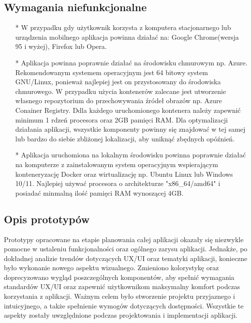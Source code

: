 \subsection{Wymagania niefunkcjonalne}
\begin{itemize}
    \item[*] W przypadku gdy użytkownik korzysta z komputera stacjonarnego lub urządzenia mobilnego aplikacja powinna działać na: Google Chrome(wersja 95 i wyżej), Firefox lub Opera. 
    \item[*] Aplikacja powinna poprawnie działać na środowisku chmurowym np. Azure. Rekomendowanym systemem operacyjnym jest 64 bitowy system GNU/Linux, ponieważ najlepiej jest on przystosowany do środowiska chmurowego. W przypadku użycia kontenerów zalecane jest utworzenie własnego repozytorium do przechowywania źródeł obrazów np. Azure Conainer Registry. Ddla każdego uruchomionego kontenera należy zapewnić minimum 1 rdzeń procesora oraz 2GB pamięci RAM. Dla optymalizacji działania aplikacji, wszystkie komponenty powinny się znajdować w tej samej lub bardzo do siebie zbliżonej lokalizacji, aby uniknąć zbędnych opóźnień.
    \item[*] Aplikacja uruchomiona na lokalnym środowisku powinna poprawnie działać na komputerze z zainstalowanym system operacyjnym wspierającym konteneryzację Docker oraz wirtualizację np. Ubuntu Linux lub Windows 10/11. Najlepiej używać procesora o architekturze "x86\_64/amd64" i posiadać minmalną ilość pamięci RAM wynoszącej 4GB.
\end{itemize}
\clearpage

\subsection{Opis prototypów}
Prototypy opracowane na etapie planowania całej aplikacji okazały się niezwykle pomocne w ustaleniu funkcjonalności oraz ogólnego zarysu aplikacji. Jednakże, po dokładnej analizie trendów dotyczących UX/UI oraz tematyki aplikacji, konieczne było wykonanie nowego aspektu wizualnego. Zmieniono kolorystykę oraz doprecyzowano wygląd poszczególnych komponentów, aby spełnić wymagania standardów UX/UI oraz zapewnić użytkownikom maksymalny komfort podczas korzystania z aplikacji. Ważnym celem było stworzenie projektu przyjaznego i intuicyjnego, a także spełnienie wymogów dotyczących dostępności. Wszystkie te aspekty zostały uwzględnione podczas projektowania i implementacji aplikacji.

